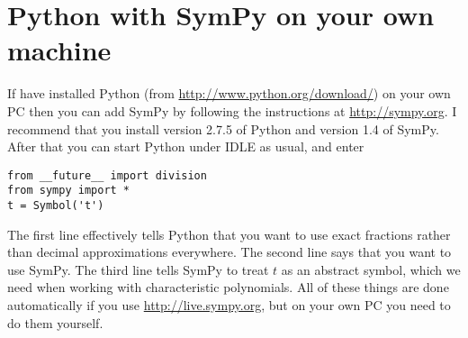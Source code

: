 \documentclass{amsart}
\begin{document}
\section*{Python with SymPy on your own machine}

If have installed Python (from \url{http://www.python.org/download/})
on your own PC then you can add SymPy by following the instructions at
\url{http://sympy.org}.  I recommend that you install version 2.7.5 of
Python and version 1.4 of SymPy.  After that you can start Python
under IDLE as usual, and enter  
\begin{verbatim}
from __future__ import division
from sympy import *
t = Symbol('t')
\end{verbatim}
The first line effectively tells Python that you want to use exact
fractions rather than decimal approximations everywhere.  The second
line says that you want to use SymPy.  The third line tells SymPy to
treat $t$ as an abstract symbol, which we need when working with
characteristic polynomials.  All of these things are done
automatically if you use \url{http://live.sympy.org}, but on your own
PC you need to do them yourself.
\end{document}
